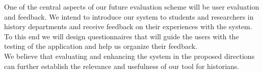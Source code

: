 One of the central aspects of our future evaluation scheme will be user evaluation and feedback. We intend to introduce our system
to students and researchers in history departments and receive feedback on their experiences with the system.
To this end we will design questionnaires that will guide the users with the testing of the application and help us organize their feedback.\\
 
We believe that evaluating and enhancing the system in the proposed directions can further establish the relevance and usefulness 
of our tool for historians.  

